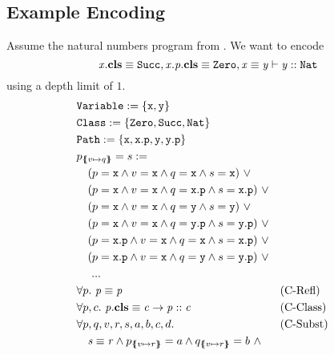 \documentclass[a4paper]{article}
\begin{document}
\newpage
%
\subsection{Example Encoding}
Assume the natural numbers program from .
We want to encode
\[ \mathit{x}.\textbf{cls} \equiv \mathit{\mathtt{Succ}}, \mathit{x.p}.\textbf{cls} \equiv \mathit{\mathtt{Zero}}, \mathit{x} \equiv \mathit{y} \vdash \mathit{y} :: \mathit{\mathtt{Nat}} \]
using a depth limit of $1$.
\begin{align}
  &\Variable := \{\mathtt{x}, \mathtt{y}\}\\
  &\Class := \{\Zero,\Succ,\Nat\}\\
  &\Path := \{\mathtt{x}, \mathtt{x}.\mathtt{p}, \mathtt{y}, \mathtt{y}.\mathtt{p}\}\\
  &\subst{p}{v}{q} = s :=\\
  &\quad (p=\mathtt{x} \land v=\mathtt{x} \land q=\mathtt{x} \land s=\mathtt{x})~\lor\\
  &\quad (p=\mathtt{x} \land v=\mathtt{x} \land q=\mathtt{x.p} \land s=\mathtt{x.p})~\lor\\
  &\quad (p=\mathtt{x} \land v=\mathtt{x} \land q=\mathtt{y} \land s=\mathtt{y})~\lor\\
  &\quad (p=\mathtt{x} \land v=\mathtt{x} \land q=\mathtt{y.p} \land s=\mathtt{y.p})~\lor\\
  &\quad (p=\mathtt{x.p} \land v=\mathtt{x} \land q=\mathtt{x} \land s=\mathtt{x.p})~\lor\\
  &\quad (p=\mathtt{x.p} \land v=\mathtt{x} \land q=\mathtt{y} \land s=\mathtt{y.p})~\lor\\
  &\quad~...\\
  &\forall p.~\pathEq{p}{p} && \text{(C-Refl)}\\
  &\forall p, c.~\instBy{p}{c} \rightarrow \instOf{p}{c} && \text{(C-Class)}\\
  &\forall p, q, v, r, s, a, b, c, d. && \text{(C-Subst)}\\
  &\quad \pathEq{s}{r} \land \subst{p}{v}{r}=a \land \subst{q}{v}{r}=b~\land\\

\end{align}
\end{document}
